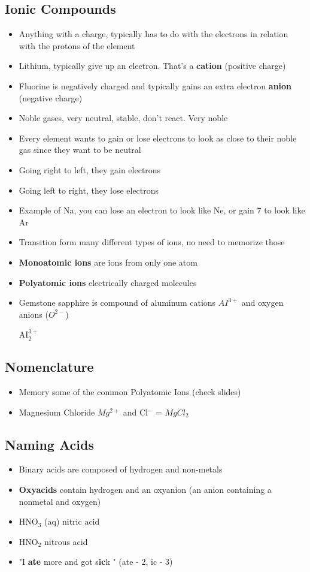 \documentclass{article}
\begin{document}
\subsection{Ionic Compounds}
\begin{itemize}
  \item Anything with a charge, typically has to do with the electrons in relation with the protons of the element
  \item Lithium, typically give up an electron. That's a \textbf{cation} (positive charge)
  \item Fluorine is negatively charged and typically gains an extra electron \textbf{anion} (negative charge)
  \item Noble gases, very neutral, stable, don't react. Very noble
  \item Every element wants to gain or lose electrons to look as close to their noble gas since they want to be neutral
  \item Going right to left, they gain electrons
  \item Going left to right, they lose electrons
  \item Example of Na, you can lose an electron to look like Ne, or gain 7 to look like Ar
  \item Transition form many different types of ions, no need to memorize those
  \item \textbf{Monoatomic ions} are ions from only one atom
  \item \textbf{Polyatomic ions} electrically charged molecules
  \item Gemstone sapphire is compound of aluminum cations $AI^{3+}$ and oxygen anions ($O^{2-}$)

    AI$^{3+}_2$
\end{itemize}

\subsection{Nomenclature}
\begin{itemize}
  \item Memory some of the common Polyatomic Ions (check slides)
  \item Magnesium Chloride $Mg^{2+}$ and Cl$^{-}$  = $MgCl_{2}$
\end{itemize}

\subsection{Naming Acids}
\begin{itemize}
  \item Binary acids are composed of hydrogen and non-metals
  \item \textbf{Oxyacids} contain hydrogen and an oxyanion (an anion containing a nonmetal and oxygen)
  \item HNO$_3$ (aq) nitric acid
  \item HNO$_2$ nitrous acid
  \item "I \textbf{ate} more and got s\textbf{ic}k " (ate - 2, ic - 3)
\end{itemize}
\end{document}
